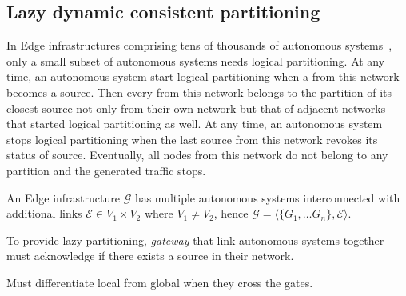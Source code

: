 

\subsection{Lazy dynamic consistent partitioning}
\label{subsec:lazy}

In Edge infrastructures comprising tens of thousands of autonomous
systems~\cite{nur2018crossas}, only a small subset of autonomous
systems needs logical partitioning. At any time, an autonomous system
start logical partitioning when a \process from this network becomes a
source.  Then every \process from this network belongs to the
partition of its closest source not only from their own network but
that of adjacent networks that started logical partitioning as well.
At any time, an autonomous system stops logical partitioning when the
last source from this network revokes its status of
source. Eventually, all nodes from this network do not belong to any
partition and the generated traffic stops.

\begin{definition}
  An Edge infrastructure $\mathcal{G}$ has multiple autonomous systems
  interconnected with additional links $\mathcal{E} \in V_1 \times
  V_2$ where $V_1 \neq V_2$, hence $\mathcal{G} = \langle \{G_1,
  \ldots G_n\}, \mathcal{E} \rangle$.
\end{definition}

\begin{definition}
  
\end{definition}

\begin{definition}
\end{definition}

To provide lazy partitioning, \emph{gateway} \nodes that link
autonomous systems together must acknowledge if there exists a source
in their network.

Must differentiate local from global when they cross the gates.





